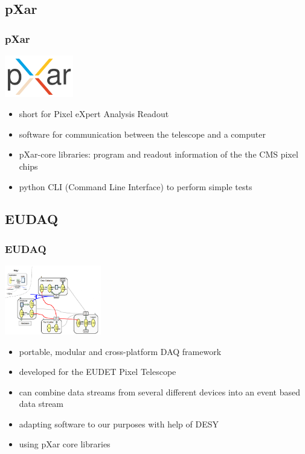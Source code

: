 \documentclass[9pt]{beamer}
\begin{document}
\subsection{pXar}
\begin{frame}
	\frametitle{pXar}
	\begin{center}
		\includegraphics[width=3cm]{Pics/pxar_logo}
	\end{center}
	\begin{itemize}
		\item short for Pixel eXpert Analysis Readout
		\item software for communication between the telescope and a computer
		\item pXar-core libraries: program and readout information of the the CMS pixel chips
		\item python CLI (Command Line Interface) to perform simple tests
	\end{itemize}
\end{frame}
\subsection{EUDAQ}
\begin{frame}
	\frametitle{EUDAQ}
	\begin{center}
		\begin{minipage}{4.5cm}
			\centering
			\includegraphics[width=4.2cm]{Pics/eudaq}
		\end{minipage}
		\hspace*{2pt}
		\begin{minipage}{6cm}
			\begin{itemize}
				\item portable, modular and cross-platform DAQ framework
				\item developed for the EUDET Pixel Telescope
				\item can combine data streams from several different devices into an event based data stream
				\item adapting software to our purposes with help of DESY 
				\item using pXar core libraries
			\end{itemize}
		\end{minipage}\no\s
	\end{center}
\end{frame}
\end{document}
